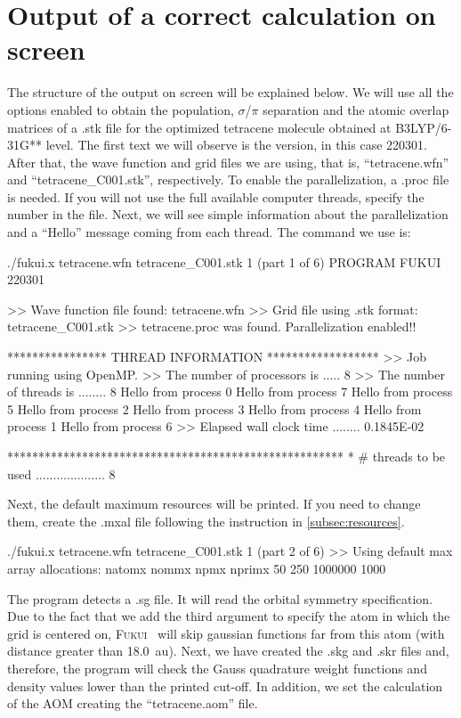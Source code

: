 \documentclass[a4paper,11pt,openany]{memoir}
\newcommand\programa{\textsc{Fukui}}
\begin{document}
\section{Output of a correct calculation on screen}\label{sec:onscreen}
The structure of the output on screen will be explained below. We will use all the options enabled to obtain the population, $\sigma$/$\pi$ separation and the atomic overlap matrices of a .stk file for the optimized tetracene molecule obtained at B3LYP/6-31G** level. The first text we will observe is the version, in this case 220301. After that, the wave function and grid files we are using, that is, ``tetracene.wfn'' and ``tetracene\_C001.stk'', respectively. To enable the parallelization, a .proc file is needed. If you will not use the full available computer threads, specify the number in the file. Next, we will see simple information about the parallelization and a ``Hello'' message coming from each thread. The command we use is:
\begin{consola}{./fukui.x tetracene.wfn tetracene\_C001.stk 1 (part 1 of 6)}
PROGRAM FUKUI 220301


>> Wave function file found: tetracene.wfn
>> Grid file using .stk format: tetracene_C001.stk
>> tetracene.proc was found. Parallelization enabled!!

**************** THREAD INFORMATION ******************
>> Job running using OpenMP.
>> The number of processors is .....   8
>> The number of threads is ........   8
Hello from process       0
Hello from process       7
Hello from process       5
Hello from process       2
Hello from process       3
Hello from process       4
Hello from process       1
Hello from process       6
>> Elapsed wall clock time ........ 0.1845E-02

******************************************************
* # threads to be used .................... 8
\end{consola}
Next, the default maximum resources will be printed. If you need to change them, create the .mxal file following the instruction in \autoref{subsec:resources}.
\begin{consola}{./fukui.x tetracene.wfn tetracene\_C001.stk 1 (part 2 of 6)}
>> Using default max array allocations:
natomx     nommx      npmx    nprimx
50       250   1000000      1000
\end{consola}
The program detects a .sg file. It will read the orbital symmetry specification. Due to the fact that we add the third argument to specify the atom in which the grid is centered on, \programa~ will skip gaussian functions far from this atom (with distance greater than \SI{18.0}{au}). Next, we have created the .skg and .skr files and, therefore, the program will check the Gauss quadrature weight functions and density values lower than the printed cut-off. In addition, we set the calculation of the \ac{AOM} creating the ``tetracene.aom'' file.
\end{document}
